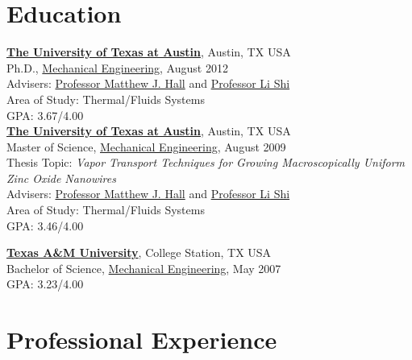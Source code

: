 \documentclass[centered]{res}
\begin{document}
\begin{resume}
\section{Education}
%
\href{http://www.utexas.edu/}{\textbf{The University of Texas at
    Austin}}, Austin, TX USA \\
Ph.D., \href{http://www.me.utexas.edu/}{Mechanical Engineering},
August 2012 \\
Advisers:
\href{http://www.me.utexas.edu/directory/faculty/hall/matthew/33/}{Professor
  Matthew J. Hall} and \href{http://www.me.utexas.edu/~lishi/}{Professor Li Shi}\\
Area of Study: Thermal/Fluids Systems \\
GPA: 3.67/4.00 \vspace{5pt} \\
%
\href{http://www.utexas.edu/}{\textbf{The University of Texas at
    Austin}}, Austin, TX USA \\
Master of Science, \href{http://www.me.utexas.edu/}{Mechanical
  Engineering}, August
2009 \\
Thesis Topic: \emph{Vapor Transport Techniques for Growing
  Macroscopically Uniform Zinc Oxide Nanowires} \\
Advisers:
\href{http://www.me.utexas.edu/directory/faculty/hall/matthew/33/}{Professor
  Matthew J. Hall} and \href{http://www.me.utexas.edu/~lishi/}{Professor Li Shi}\\
Area of Study: Thermal/Fluids Systems \\
GPA: 3.46/4.00 

\href{http://www.tamu.edu/}{\textbf{Texas A\&M University}}, College
Station, TX USA \\
Bachelor of Science, \href{http://www.mengr.tamu.edu/}{Mechanical
  Engineering}, May
2007  \\
GPA: 3.23/4.00

\section{Professional Experience}


\end{resume}
\end{document}

